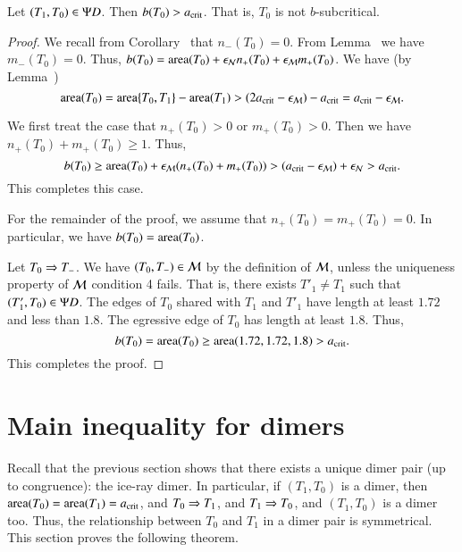 \begin{lemma}  
  Let $(T_1,T_0)\in\Psi D$.  Then $b(T_0) > a_\text{crit}$.  That is, $T_0$ is
  not $b$-subcritical.
\end{lemma}

\begin{proof}
  We recall from Corollary~ that $n_-(T_0)=0$.  From
  Lemma~ we have $m_-(T_0)=0$.  Thus, $b(T_0) =
  {\operatorname{area}}(T_0) + \epsilon_{\mathcal N} n_+(T_0) + \epsilon_{\mathcal M} m_+(T_0)$.  We have
  (by Lemma~)
\[
{\operatorname{area}}(T_0) = {\operatorname{area}}\{T_0,T_1\} - {\operatorname{area}}(T_1) 
> (2a_\text{crit}-\epsilon_{\mathcal M}) -a_\text{crit} = a_\text{crit} - \epsilon_{\mathcal M}.
\]

We first treat the case that $n_+(T_0)>0$ or $m_+(T_0)>0$.  Then we have $n_+(T_0)+m_+(T_0)\ge
1$.  Thus, 
\[
b(T_0) \ge {\operatorname{area}}(T_0) + \epsilon_{\mathcal M} (n_+(T_0)+m_+(T_0)) > (a_\text{crit} - \epsilon_{\mathcal M})
+ \epsilon_{\mathcal N} > a_\text{crit}.
\]
This completes this case.

For the remainder of the proof, we assume that $n_+(T_0)=m_+(T_0)=0$.  In
particular, we have $b(T_0) = {\operatorname{area}}(T_0)$.


Let $T_0\Rightarrow T_-$.  We have $(T_0,T_-)\in\mathcal M$ by the definition of $\mathcal M$,
unless the uniqueness property of $\mathcal M$ condition 4 fails.  That is,
there exists $T'_1\ne T_1$ such that $(T'_1,T_0)\in\Psi D$.  The edges of
$T_0$ shared with $T_1$ and $T'_1$ have length at least $1.72$ and
less than $1.8$.  The egressive edge of $T_0$ has length at least
$1.8$.  Thus,
\[
b(T_0) = {\operatorname{area}} (T_0) \ge {\operatorname{area}}(1.72,1.72,1.8) > a_\text{crit}.
\]
This completes the proof.
\end{proof}


\section{Main inequality for dimers}

Recall that the previous section shows that there exists a unique
dimer pair (up to congruence): the ice-ray dimer.  In particular, if
$(T_1,T_0)$ is a dimer, then ${\operatorname{area}}(T_0)={\operatorname{area}}(T_1)=a_\text{crit}$, and
$T_0\Rightarrow T_1$, and $T_1\Rightarrow T_0$, and $(T_1,T_0)$ is a dimer too.  Thus,
the relationship between $T_0$ and $T_1$ in a dimer pair is
symmetrical.  This section proves the following theorem.

